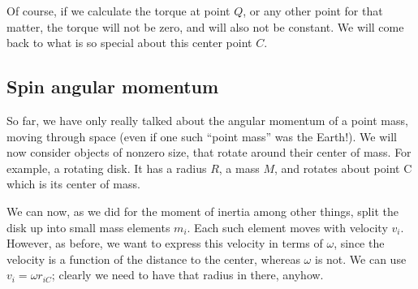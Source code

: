 Of course, if we calculate the torque at point $Q$, or any other point for that matter, the torque will not be zero, and will also not be constant. We will come back to what is so special about this center point $C$.

\subsection{Spin angular momentum}

So far, we have only really talked about the angular momentum of a point mass, moving through space (even if one such ``point mass'' was the Earth!). We will now consider objects of nonzero size, that rotate around their center of mass. For example, a rotating disk. It has a radius $R$, a mass $M$, and rotates about point C which is its center of mass.

\begin{figure}[H]
  \centering
{}
\end{figure}



We can now, as we did for the moment of inertia among other things, split the disk up into small mass elements $m_i$. Each such element moves with velocity $v_i$. However, as before, we want to express this velocity in terms of $\omega$, since the velocity is a function of the distance to the center, whereas $\omega$ is not. We can use $v_i = \omega r_{iC}$; clearly we need to have that radius in there, anyhow.

